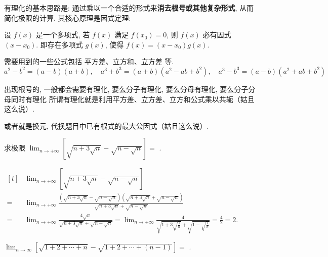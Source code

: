 \begin{knowledge}
  有理化的基本思路是:
  通过乘以一个合适的形式来\textbf{消去根号或其他复杂形式},
  从而简化极限的计算.
  其核心原理是因式定理:
  \begin{notes}[因式定理][][green]
    设 $f(x)$ 是一个多项式,
    若 $f(x)$ 满足 $f(x_0) = 0$,
    则 $f(x)$ 必有因式 $(x-x_0)$.
    即存在多项式 $g(x)$,
    使得 $f(x) = (x-x_0)g(x)$.
  \end{notes}
  需要用到的一些公式包括 平方差、立方和、立方差 等.
  \[
    a^2 - b^2 = (a-b)(a+b),
    \quad
    a^3 + b^3 = (a+b)(a^2-ab+b^2),
    \quad
    a^3 - b^3 = (a-b)(a^2+ab+b^2)
  \]

  \begin{notes}[含根式极限的处理方法]
    出现根号的,
    一般都会需要有理化,
    要么分子有理化,
    要么分母有理化,
    要么分子分母同时有理化
    所谓有理化就是利用平方差、立方差、立方和公式乘以共轭（姑且这么说）.

    或者就是换元,
    代换题目中已有根式的最大公因式（姑且这么说）.
  \end{notes}
\end{knowledge}

\begin{question}
  求极限 $\lim_{n \to +\infty} \left[ \sqrt{n+3\sqrt{n}}-\sqrt{n-\sqrt{n}} \right] =$
  \fillin[$2$].
\end{question}

\begin{analysis}
  $\begin{aligned}[t]
        & \lim_{n \to +\infty} \left[ \sqrt{n+3\sqrt{n}}-\sqrt{n-\sqrt{n}} \right]                                                                                                  \\
      = & \lim_{n \to +\infty} \frac{\left( \sqrt{n+3\sqrt{n}}-\sqrt{n-\sqrt{n}} \right) \left( \sqrt{n+3\sqrt{n}}+\sqrt{n-\sqrt{n}} \right)}{\sqrt{n+3\sqrt{n}}+\sqrt{n-\sqrt{n}}} \\
      = & \lim_{n \to +\infty} \frac{4\sqrt{n}}{\sqrt{n+3\sqrt{n}}+\sqrt{n-\sqrt{n}}}
      = \lim_{n \to +\infty} \frac{4}{\sqrt{1+3\sqrt{\frac{1}{n}}}+\sqrt{1-\sqrt{\frac{1}{n}}}}
      = \frac{4}{2}
      = 2.
    \end{aligned}$
\end{analysis}

\begin{question}
  $\lim_{n \to \infty} \left[ \sqrt{1+2+\cdots+n}-\sqrt{1+2+\cdots+(n-1)} \right] =$
  .
\end{question}

